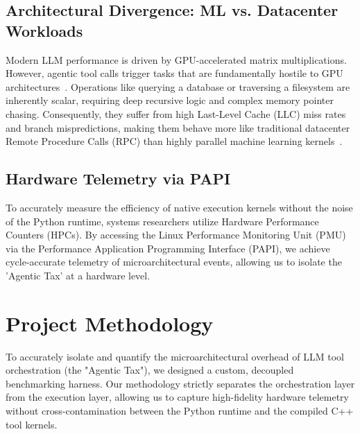 \documentclass[10pt, letterpaper]{article}
\begin{document}
\subsection{Architectural Divergence: ML vs. Datacenter Workloads}
Modern LLM performance is driven by GPU-accelerated matrix multiplications. However, agentic tool calls trigger tasks that are fundamentally hostile to GPU architectures~\cite{cpu_centric}. Operations like querying a database or traversing a filesystem are inherently scalar, requiring deep recursive logic and complex memory pointer chasing. Consequently, they suffer from high Last-Level Cache (LLC) miss rates and branch mispredictions, making them behave more like traditional datacenter Remote Procedure Calls (RPC) than highly parallel machine learning kernels~\cite{data_systems}.

\subsection{Hardware Telemetry via PAPI}
To accurately measure the efficiency of native execution kernels without the noise of the Python runtime, systems researchers utilize Hardware Performance Counters (HPCs). By accessing the Linux Performance Monitoring Unit (PMU) via the Performance Application Programming Interface (PAPI), we achieve cycle-accurate telemetry of microarchitectural events, allowing us to isolate the 'Agentic Tax' at a hardware level.

\section{Project Methodology}

To accurately isolate and quantify the microarchitectural overhead of LLM tool orchestration (the "Agentic Tax"), we designed a custom, decoupled benchmarking harness. Our methodology strictly separates the orchestration layer from the execution layer, allowing us to capture high-fidelity hardware telemetry without cross-contamination between the Python runtime and the compiled C++ tool kernels.
\end{document}
